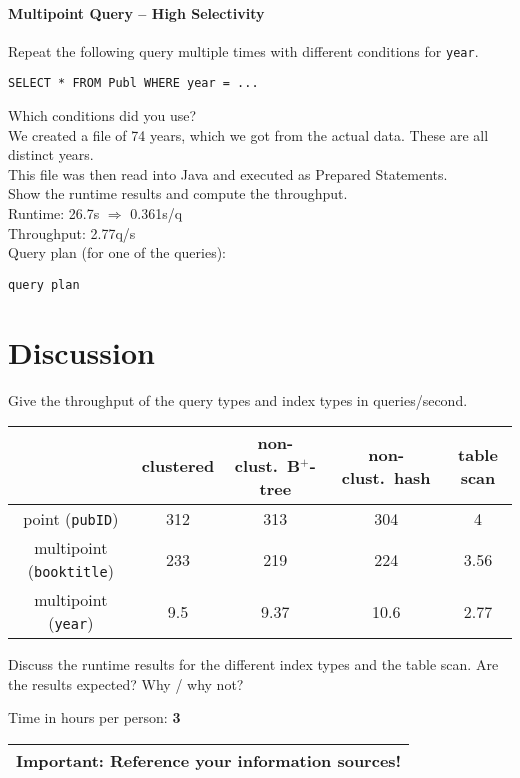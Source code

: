 \documentclass[11pt]{scrartcl}
\begin{document}
\paragraph{Multipoint Query -- High Selectivity}

Repeat the following query multiple times with different conditions for {\tt year}.

{\small
\begin{verbatim}
SELECT * FROM Publ WHERE year = ...
\end{verbatim}
}

\noindent
Which conditions did you use?\\
We created a file of 74 years, which we got from the actual data. These are all distinct years.\\
This file was then read into Java and executed as Prepared Statements.\\

\smallskip\noindent
Show the runtime results and compute the throughput.\\
Runtime: 26.7s $\Rightarrow$ 0.361s/q\\
Throughput: 2.77q/s\\


\smallskip\noindent
Query plan (for one of the queries):
{\small
\begin{verbatim}
query plan
\end{verbatim}
}

\section{Discussion}

Give the throughput of the query types and index types in queries/second.
\begin{center}
  \begin{tabular}{c|c|c|c|c}
    & clustered & non-clust.\ B$^+$-tree & non-clust.\ hash & table scan \\
    \hline
    point ({\tt pubID}) & 312 & 313 & 304 & 4\\
    \hline
    multipoint ({\tt booktitle}) & 233 & 219 & 224 & 3.56 \\
    \hline
    multipoint  ({\tt year}) & 9.5 & 9.37 & 10.6 & 2.77 \\  
  \end{tabular}
\end{center}

\medskip

Discuss the runtime results for the different index types and the
table scan. Are the results expected? Why / why not?\\


\bigskip

\noindent Time in hours per person: {\bf 3}

\bigskip

\begin{center}
  \begin{tabular}{c}
    \hline
    {\bf Important:} Reference your information sources!
    \\\hline
  \end{tabular}
\end{center}
\end{document}
